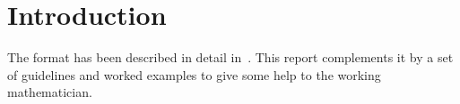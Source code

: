 \chapter{Introduction}
\label{sec:intro}
The {\omdoc} format has been described in detail in~\cite{Kohlhase:omfmd01}. This
report complements it by a set of guidelines and worked examples to give some help
to the working mathematician.

